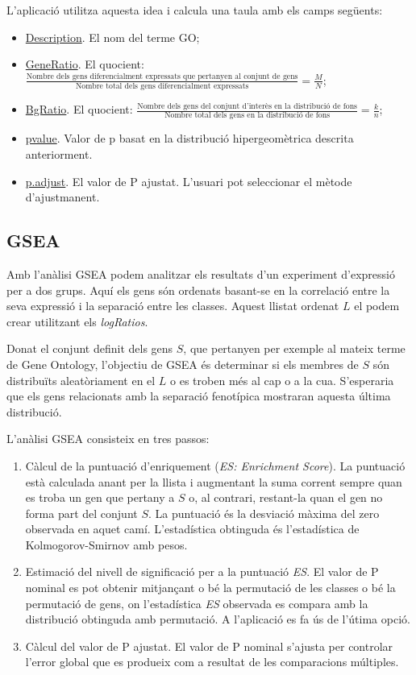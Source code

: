 \documentclass[]{article}
\begin{document}
L'aplicació utilitza aquesta idea i calcula una taula amb els camps següents:


\begin{itemize}
\item \underline{Description}. El nom del terme GO;
\item \underline{GeneRatio}. El quocient: $\displaystyle\frac{\mbox{Nombre dels gens diferencialment expressats que pertanyen al conjunt de gens}}{\mbox{Nombre total dels gens diferencialment expressats}}=\frac{M}{N}$; 
\item \underline{BgRatio}. El quocient: $\displaystyle\frac{\mbox{Nombre dels gens del conjunt d'interès en la distribució de fons}}{\mbox{Nombre total dels gens en la distribució de fons}}=\frac{k}{n}$;
\item \underline{pvalue}. Valor de p basat en la distribució hipergeomètrica descrita anteriorment.
\item \underline{p.adjust}. El valor de P ajustat. L'usuari pot seleccionar el mètode d'ajustmanent.
\end{itemize}


\subsection{GSEA}

Amb l'anàlisi GSEA podem analitzar els resultats d'un experiment d'expressió per a dos grups. Aquí els gens són ordenats basant-se en la correlació entre la seva expressió i la separació entre les classes. Aquest llistat ordenat $L$ el podem crear utilitzant els \textit{logRatios}.

Donat el conjunt definit dels gens $S$, que pertanyen per exemple al mateix terme de Gene Ontology, l'objectiu de GSEA és determinar si els membres de $S$ són distribuïts aleatòriament en el $L$ o es troben més al cap o a la cua. S'esperaria que els gens relacionats amb la separació fenotípica mostraran aquesta última distribució. 

L'anàlisi GSEA consisteix en tres passos:

\begin{enumerate}
\item Càlcul de la puntuació d'enriquement (\textit{ES: Enrichment Score}). La puntuació està calculada anant per la llista i augmentant la suma corrent sempre quan es troba un gen que pertany a $S$ o, al contrari, restant-la quan el gen no forma part del conjunt $S$. La puntuació és la desviació màxima del zero observada en aquet camí. L'estadística obtinguda és l’estadística de Kolmogorov-Smirnov amb pesos.

\item Estimació del nivell de significació per a la puntuació \textit{ES}. El valor de P nominal es pot obtenir mitjançant o bé la permutació de les classes o bé la permutació de gens, on l'estadística \textit{ES} observada es compara amb la distribució obtinguda amb permutació. A l'aplicació es fa ús de l'útima opció.
\item Càlcul del valor de P ajustat. El valor de P nominal s'ajusta per controlar l'error global que es produeix com a resultat de les comparacions múltiples.
\end{enumerate}
\end{document}
